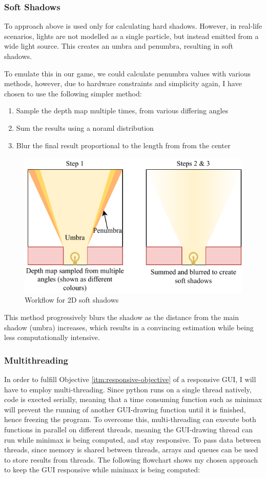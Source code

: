 \documentclass[../main/main.tex]{subfiles}
\begin{document}
\subsubsection*{Soft Shadows}
To approach above is used only for calculating hard shadows. However, in real-life scenarios, lights are not modelled as a single particle, but instead emitted from a wide light source. This creates an umbra and penumbra, resulting in soft shadows.

To emulate this in our game, we could calculate penumbra values with various methods, however, due to hardware constraints and simplicity again, I have chosen to use the following simpler method:

\begin{enumerate}
\item Sample the depth map multiple times, from various differing angles
\item Sum the results using a noraml distribution
\item Blur the final result proportional to the length from from the center
\end{enumerate}

\begin{figure}[H]
    \centering
    \includegraphics[width=0.8\columnwidth]{../design/assets/soft_shadows.pdf}
    \caption{Workflow for 2D soft shadows}
    \label{fig:soft-shadows}
\end{figure}

This method progressively blurs the shadow as the distance from the main shadow (umbra) increases, which results in a convincing estimation while being less computationally intensive.

\subsubsection{Multithreading}
In order to fulfill Objective \ref{itm:responsive-objective} of a responsive GUI, I will have to employ multi-threading. Since python runs on a single thread natively, code is exected serially, meaning that a time consuming function such as minimax will prevent the running of another GUI-drawing function until it is finished, hence freezing the program. To overcome this, multi-threading can execute both functions in parallel on different threads, meaning the GUI-drawing thread can run while minimax is being computed, and stay responsive. To pass data between threads, since memory is shared between threads, arrays and queues can be used to store results from threads. The following flowchart shows my chosen approach to keep the GUI responsive while minimax is being computed:
\end{document}

